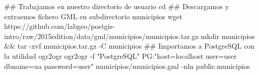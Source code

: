 \lstset{caption=Importación de municipios,label=bash:importarMunicipios}
\begin{bash}
## Trabajamos en nuestro directorio de usuario
cd
## Descargamos y extraemos fichero GML en subdirectorio municipios
wget https://github.com/labgeo/postgis-intro/raw/2015edition/data/gml/municipios/municipios.tar.gz
mkdir municipios && tar -xvf municipios.tar.gz -C municipios
## Importamos a PostgreSQL con la utilidad ogr2ogr
ogr2ogr -f "PostgreSQL" PG:"host=localhost user=user dbname=ua password=user" municipios/municipios.gml -nln public.municipios
\end{bash}
